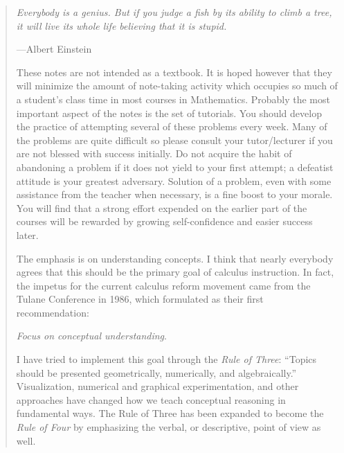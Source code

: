 \documentclass[titlepage,a4paper,12pt]{report}
\begin{document}
\begin{abstract}
\begin{center}
	\small{\parbox{18cm}{
		\begin{raggedright}
		{\small
		\textit{Everybody is a genius. But if you judge a fish by its ability to climb a tree, it will live its whole life believing that it is stupid.}
 }
 
				\vspace{.5cm}\hfill{---Albert Einstein}
		\end{raggedright}
	}
} 
\end{center}
These notes are not intended as a textbook. It is hoped however that they will minimize the amount of note-taking activity which occupies so much of a student’s class time in most courses in Mathematics. Probably the most important aspect of the notes is the set of tutorials. You should develop the practice of attempting several of these problems every week. Many of the problems are quite difficult so please consult your
tutor/lecturer if you are not blessed with success initially. Do not acquire the habit of abandoning a problem if it does not yield to your first attempt; a defeatist
attitude is your greatest adversary. Solution of a problem, even with some assistance
from the teacher when necessary, is a fine boost to your morale. You will find that a strong effort expended on the earlier part of the courses will be rewarded by growing
self-confidence and easier success later.

\noindent The emphasis is on understanding concepts. I think that nearly everybody agrees that
this should be the primary goal of calculus instruction. In fact, the impetus for the current
calculus reform movement came from the Tulane Conference in 1986, which formulated
as their first recommendation:
\begin{center}
\textit{Focus on conceptual understanding}.
\end{center}

\noindent I have tried to implement this goal through the \textit{Rule of Three}: ``Topics should be presented
geometrically, numerically, and algebraically.'' Visualization, numerical and graphical experimentation,
and other approaches have changed how we teach conceptual reasoning in fundamental
ways. The Rule of Three has been expanded to become the \textit{Rule of Four} by
emphasizing the verbal, or descriptive, point of view as well.
\end{abstract}
\end{document}
